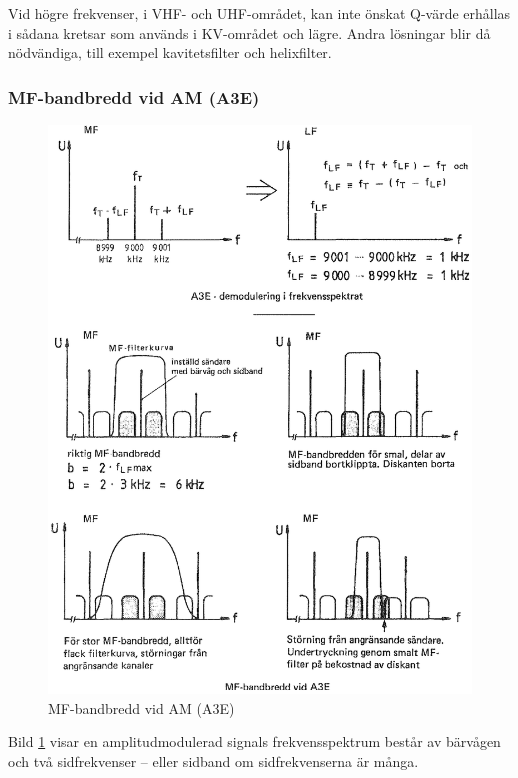 Vid högre frekvenser, i VHF- och UHF-området, kan inte önskat Q-värde
erhållas i sådana kretsar som används i KV-området och lägre.
Andra lösningar blir då nödvändiga, till exempel kavitetsfilter och helixfilter.

\subsubsection{MF-bandbredd vid AM (A3E)}

\begin{figure}
  \includegraphics[width=\textwidth]{images/cropped_pdfs/bild_2_4-26.pdf}
  \caption{MF-bandbredd vid AM (A3E)}
  \label{fig:bildII4-26}
\end{figure}

Bild \ref{fig:bildII4-26} visar en amplitudmodulerad signals frekvensspektrum
består av bärvågen och två sidfrekvenser -- eller sidband om sidfrekvenserna
är många.


